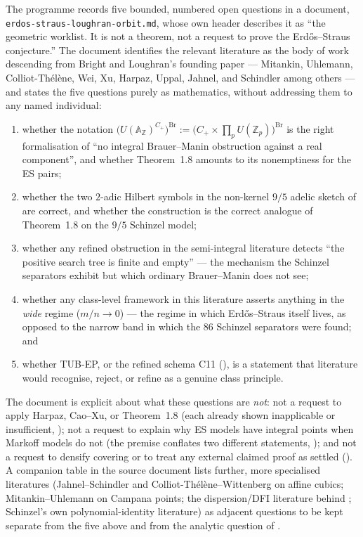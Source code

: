 \documentclass[11pt]{article}
\theoremstyle{plain}
\theoremstyle{definition}
\theoremstyle{remark}
\renewcommand{\_}{\textunderscore\allowbreak}
\newcommand{\Z}{\mathbb{Z}}
\begin{document}
The programme records five bounded, numbered open questions in a document,
\texttt{erdos-\allowbreak straus-\allowbreak loughran-\allowbreak orbit.md}, whose own header describes it as ``the geometric
worklist. It is not a theorem, not a request to prove the Erd\H{o}s--Straus conjecture.'' The
document identifies the relevant literature as the body of work descending from Bright and
Loughran's founding paper \cite{BrightLoughran2020} — Mitankin, Uhlemann, Colliot-Th\'el\`ene,
Wei, Xu, Harpaz, Uppal, Jahnel, and Schindler among others — and states the five questions
purely as mathematics, without addressing them to any named individual:
\begin{enumerate}[leftmargin=1.6em]
  \item whether the notation
        $\bigl(U(\mathbb A_\Z)^{C_+}\bigr)^{\mathrm{Br}} := \bigl(C_+\times\prod_p U(\Z_p)\bigr)^{\mathrm{Br}}$
        is the right formalisation of ``no integral Brauer--Manin obstruction against a real
        component'', and whether Theorem~1.8 amounts to its nonemptiness for the ES pairs;
  \item whether the two $2$-adic Hilbert symbols in the non-kernel $9/5$ adelic sketch of
         are correct, and whether the construction is the correct analogue
        of Theorem~1.8 on the $9/5$ Schinzel model;
  \item whether any refined obstruction in the semi-integral literature detects ``the positive
        search tree is finite and empty'' — the mechanism the Schinzel separators exhibit but
        which ordinary Brauer--Manin does not see;
  \item whether any class-level framework in this literature asserts anything in the
        \emph{wide} regime ($m/n\to0$) — the regime in which Erd\H{o}s--Straus itself lives, as
        opposed to the narrow band in which the 86 Schinzel separators were found; and
  \item whether TUB-EP, or the refined schema C11 (), is a statement that
        literature would recognise, reject, or refine as a genuine class principle.
\end{enumerate}
The document is explicit about what these questions are \emph{not}: not a request to apply
Harpaz, Cao--Xu, or Theorem~1.8 (each already shown inapplicable or insufficient,
); not a request to explain why ES models have integral
points when Markoff models do not (the premise conflates two different statements,
); and not a request to densify covering or to treat any external claimed
proof as settled (). A companion table in the source document lists further,
more specialised literatures (Jahnel--Schindler and Colliot-Th\'el\`ene--Wittenberg on affine
cubics; Mitankin--Uhlemann on Campana points; the dispersion/DFI literature behind
; Schinzel's own polynomial-identity literature) as adjacent questions to
be kept separate from the five above and from the analytic question of .
\end{document}

